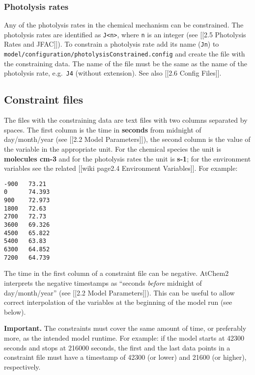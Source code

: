 \hypertarget{photolysis-rates}{%
\subsubsection{Photolysis rates}\label{photolysis-rates}}

Any of the photolysis rates in the chemical mechanism can be
constrained. The photolysis rates are identified as
\texttt{J\textless{}n\textgreater{}}, where \texttt{n} is an integer
(see {[}{[}2.5 Photolysis Rates and JFAC{]}{]}). To constrain a
photolysis rate add its name (\texttt{Jn}) to
\texttt{model/configuration/photolysisConstrained.config} and create the
file with the constraining data. The name of the file must be the same
as the name of the photolysis rate, e.g.~\texttt{J4} (without
extension). See also {[}{[}2.6 Config Files{]}{]}.

\hypertarget{constraint-files}{%
\subsection{Constraint files}\label{constraint-files}}

The files with the constraining data are text files with two columns
separated by spaces. The first column is the time in \textbf{seconds}
from midnight of day/month/year (see {[}{[}2.2 Model Parameters{]}{]}),
the second column is the value of the variable in the appropriate unit.
For the chemical species the unit is \textbf{molecules cm-3} and for the
photolysis rates the unit is \textbf{s-1}; for the environment variables
see the related {[}{[}wiki page\textbar{}2.4 Environment
Variables{]}{]}. For example:

\begin{verbatim}
-900   73.21
0      74.393
900    72.973
1800   72.63
2700   72.73
3600   69.326
4500   65.822
5400   63.83
6300   64.852
7200   64.739
\end{verbatim}

The time in the first column of a constraint file can be negative.
AtChem2 interprets the negative timestamps as ``seconds \emph{before}
midnight of day/month/year'' (see {[}{[}2.2 Model Parameters{]}{]}).
This can be useful to allow correct interpolation of the variables at
the beginning of the model run (see below).

\textbf{Important.} The constraints must cover the same amount of time,
or preferably more, as the intended model runtime. For example: if the
model starts at 42300 seconds and stops at 216000 seconds, the first and
the last data points in a constraint file must have a timestamp of 42300
(or lower) and 21600 (or higher), respectively.

